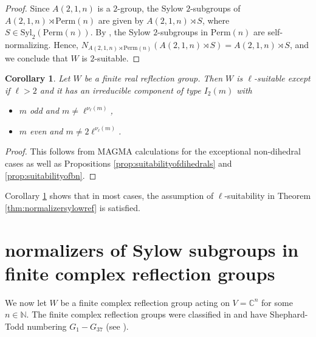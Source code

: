 \documentclass[12pt]{amsart}
\theoremstyle{plain}
\newtheorem{corollary}[theorem]{Corollary}
\theoremstyle{definition}
\numberwithin{equation}{section}
\newcommand{\N}{\mathbb{N}}
\numberwithin{equation}{section}
\begin{document}
	\begin{proof}
		Since $A(2,1,n)$ is a $2$-group, the Sylow $2$-subgroups of $A(2,1,n)\rtimes \text{Perm}(n)$ are given by $A(2,1,n)\rtimes S$, where $S\in \text{Syl}_2(\text{Perm}(n))$. By \cite[Corollary A.13.3]{Berkovich}, the Sylow $2$-subgroups in $\text{Perm}(n)$ are self-normalizing. Hence, $N_{A(2,1,n)\rtimes \text{Perm}(n)}(A(2,1,n)\rtimes S)=A(2,1,n)\rtimes S$, and we conclude that $W$ is $2$-suitable.
	\end{proof}
	
	\begin{corollary}\label{cor:suitability}
		Let $W$ be a finite real reflection group. Then $W$ is $\ell$-suitable except if $\ell>2$ and it has an irreducible component of type $I_2(m)$ with
		\begin{itemize}
			\item[(i)] $m$ odd and $m\neq \ell^{\nu_\ell(m)}$,
			\item[(ii)] $m$ even and $m\neq2\ell^{\nu_\ell(m)}$.
		\end{itemize}
	\end{corollary}
	
	\begin{proof}
		This follows from MAGMA calculations for the exceptional non-dihedral cases as well as Propositions \ref{prop:suitabilityofdihedrals} and \ref{prop:suitabilityofbn}.
	\end{proof}
	
	Corollary \ref{cor:suitability} shows that in most cases, the assumption of $\ell$-suitability in Theorem \ref{thm:normalizersylowref} is satisfied.
	
	\section{normalizers of Sylow subgroups in finite complex reflection groups}\label{complexcase}
	
	We now let $W$ be a finite complex reflection group acting on $V=\mathbb{C}^n$ for some $n\in \N$. The finite complex reflection groups were classified in \cite{TODD} and have Shephard-Todd numbering $G_1-G_{37}$ (see \cite[Chap. 8 \S 7]{GUSTAY}).
	
\end{document}
